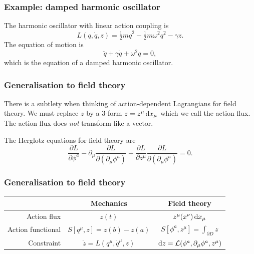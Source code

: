\documentclass[xcolor=dvipsnames]{beamer}
\begin{document}
\begin{frame}
	\frametitle{Example: damped harmonic oscillator}
	The harmonic oscillator with linear action coupling is \pause
	\begin{equation*}
		L(q, \dot{q}, z) = \tfrac{1}{2}m\dot{q}^2 - \tfrac{1}{2} m\omega^2 q^2 - \gamma z. 
	\end{equation*}
	\pause The equation of motion is \pause
	\begin{equation*}
		\ddot{q} + \gamma\dot{q} + \omega^2 q = 0,
	\end{equation*}
	which is the equation of a damped harmonic oscillator. 
\end{frame}

\begin{frame}
	\frametitle{Generalisation to field theory}
	There is a subtlety when thinking of action-dependent Lagrangians for field theory. We
	must replace \( z \) by a 3-form \( z = z^\mu \,\mathrm{d} x_\mu \) which we call the action
	flux. \pause The action flux does \emph{not} transform like a vector. 

	\pause The Herglotz equations for field theory are
	\begin{equation*}
		\frac{\partial L}{\partial \phi^a} - \partial_\mu \frac{\partial
			L}{\partial(\partial_\mu \phi^a)} + \frac{\partial L}{\partial z^\mu} \frac{\partial
		L}{\partial(\partial_\mu \phi^a)} = 0. 
	\end{equation*}
\end{frame}

\begin{frame}
	\frametitle{Generalisation to field theory}
	\begin{tabular}{rcc}
		\toprule
		& Mechanics & Field theory \\
		\midrule
		\pause
		Action flux & \( z(t) \) & \( z^\mu(x^\nu) \,\mathrm{d} x_\mu \) \\
		\pause
		Action functional & \( S[q^\mu, z] = z(b) - z(a) \) & \( S[\phi^a,
		z^\mu] = \int_{\partial D} z \) \\
		\pause
		Constraint & \( \dot{z} = L(q^\mu, \dot{q}^\mu, z) \) & \( \,\mathrm{d} z = \mathcal{L}(\phi^a,
		\partial_\mu \phi^a, z^\mu) \) \\
		\bottomrule 
	\end{tabular}
\end{frame}
\end{document}
